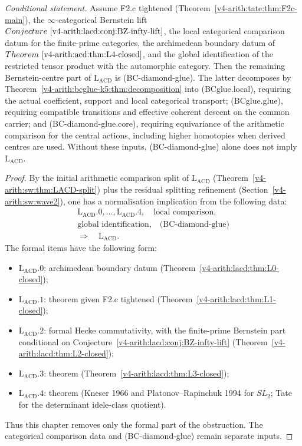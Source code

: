 \begin{corollary}
\label{v4-arith:lacd:cor:LACD-residual}
\emph{Conditional statement.} Assume F2.c tightened
(Theorem~\ref{v4-arith:tate:thm:F2c-main}), the
\(\infty\)-categorical Bernstein lift
\(Conjecture~\ref{v4-arith:lacd:conj:BZ-infty-lift}\), the local categorical
comparison datum for the finite-prime categories, the archimedean
boundary datum of \(Theorem~\ref{v4-arith:acd:thm:L4-closed}\), and the
global identification of the restricted tensor product with the
automorphic category. Then the remaining Bernstein-centre part of
\(\mathrm{L}_{\mathrm{ACD}}\) is (BC-diamond-glue). The latter
decomposes by
Theorem~\ref{v4-arith:bcglue-k5:thm:decomposition} into (BCglue.local), requiring the actual coefficient, support and
local categorical transport; (BCglue.glue), requiring compatible
transitions and effective coherent descent on the common carrier;
and (BC-diamond-glue.core), requiring equivariance of the arithmetic
comparison for the central actions, including higher homotopies
when derived centres are used. Without these inputs, (BC-diamond-glue) alone
does not imply \(\mathrm{L}_{\mathrm{ACD}}\).
\end{corollary}

\begin{proof}
By the initial arithmetic comparison split of \(\mathrm{L}_{\mathrm{ACD}}\)
(Theorem~\ref{v4-arith:sw:thm:LACD-split}) plus the residual splitting refinement
(Section~\ref{v4-arith:sw:wave2}), one has a normalisation implication from
the following data:
\[
\begin{gathered}
\mathrm{L}_{\mathrm{ACD}}.0,\ldots,\mathrm{L}_{\mathrm{ACD}}.4,\quad
\text{local comparison},\\
\text{global identification},\quad\text{(BC-diamond-glue)}\\
\Longrightarrow\quad\mathrm{L}_{\mathrm{ACD}}.
\end{gathered}
\]
The formal items have the following form:
\begin{itemize}
\item \(\mathrm{L}_{\mathrm{ACD}}.0\): archimedean boundary datum
(Theorem~\ref{v4-arith:lacd:thm:L0-closed});
\item \(\mathrm{L}_{\mathrm{ACD}}.1\): theorem given F2.c tightened
(Theorem~\ref{v4-arith:lacd:thm:L1-closed});
\item \(\mathrm{L}_{\mathrm{ACD}}.2\): formal Hecke commutativity,
with the finite-prime Bernstein part conditional on
Conjecture~\ref{v4-arith:lacd:conj:BZ-infty-lift}
(Theorem~\ref{v4-arith:lacd:thm:L2-closed});
\item \(\mathrm{L}_{\mathrm{ACD}}.3\): theorem
(Theorem~\ref{v4-arith:lacd:thm:L3-closed});
\item \(\mathrm{L}_{\mathrm{ACD}}.4\): theorem (Kneser 1966 and
Platonov--Rapinchuk 1994 for \(SL_{2}\); Tate for the determinant
idele-class quotient).
\end{itemize}
Thus this chapter removes only the formal part of the obstruction.
The categorical comparison data and (BC-diamond-glue) remain separate
inputs.
\end{proof}

